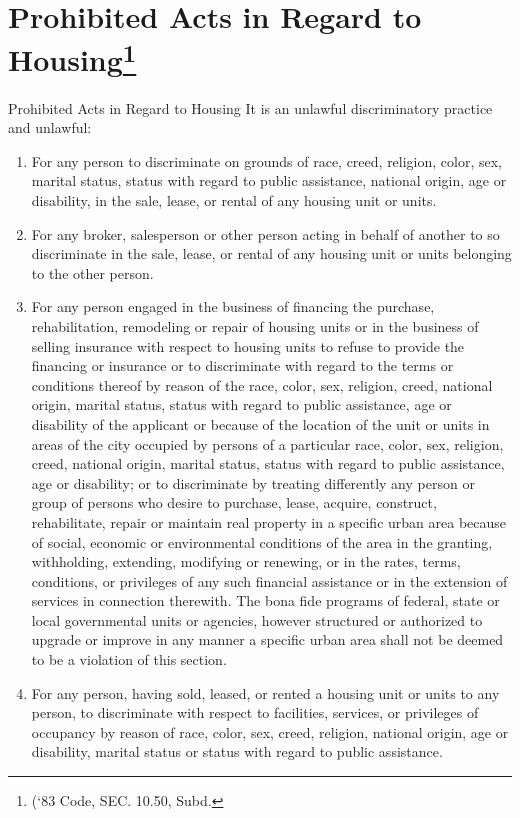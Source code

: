 \section{Prohibited Acts in Regard to Housing\footnote{(‘83 Code, SEC. 10.50, Subd.}}
Prohibited Acts in Regard to Housing
It is an unlawful discriminatory practice and unlawful:
\begin{enumerate}[{\indent}A)]
    \item For any person to discriminate on grounds of race, creed, religion, color, sex, marital status, status with regard to public assistance, national origin, age or disability, in the sale, lease, or rental of any housing unit or units.
    \item For any broker, salesperson or other person acting in behalf of another to so discriminate in the sale, lease, or rental of any housing unit or units belonging to the other person.
    \item For any person engaged in the business of financing the purchase, rehabilitation, remodeling or repair of housing units or in the business of selling insurance with respect to housing units to refuse to provide the financing or insurance or to discriminate with regard to the terms or conditions thereof by reason of the race, color, sex, religion, creed, national origin, marital status, status with regard to public assistance, age or disability of the applicant or because of the location of the unit or units in areas of the city occupied by persons of a particular race, color, sex, religion, creed, national origin, marital status, status with regard to public assistance, age or disability; or to discriminate by treating differently any person or group of persons who desire to purchase, lease, acquire, construct, rehabilitate, repair or maintain real property in a specific urban area because of social, economic or environmental conditions of the area in the granting, withholding, extending, modifying or renewing, or in the rates, terms, conditions, or privileges of any such financial assistance or in the extension of services in connection therewith.  The bona fide programs of federal, state or local governmental units or agencies, however structured or authorized to upgrade or improve in any manner a specific urban area shall not be deemed to be a violation of this section.
    \item For any person, having sold, leased, or rented a housing unit or units to any person, to discriminate with respect to facilities, services, or privileges of occupancy by reason of race, color, sex, creed, religion, national origin, age or disability, marital status or status with regard to public assistance.

\end{enumerate}
